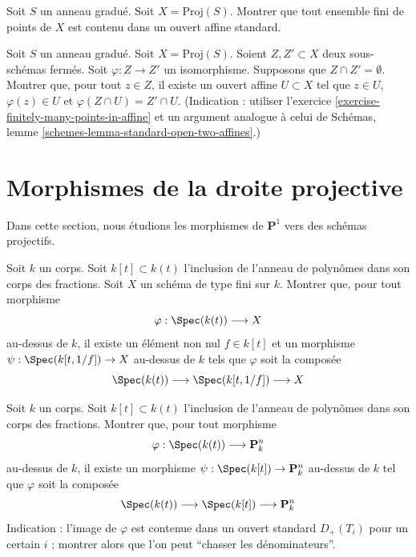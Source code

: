 \begin{exercise}
\label{exercise-finitely-many-points-in-affine}
Soit $S$ un anneau gradué.
Soit $X = \text{Proj}(S)$.
Montrer que tout ensemble fini de points de $X$ est contenu dans un ouvert
affine standard.
\end{exercise}

\begin{exercise}
\label{exercise-prepare-glueing}
Soit $S$ un anneau gradué.
Soit $X = \text{Proj}(S)$.
Soient $Z, Z' \subset X$ deux sous-schémas fermés.
Soit $\varphi : Z \to Z'$ un isomorphisme.
Supposons que $Z \cap Z' = \emptyset$.
Montrer que, pour tout $z \in Z$, il existe un ouvert affine
$U \subset X$ tel que $z \in U$, $\varphi(z) \in U$ et
$\varphi(Z \cap U) = Z' \cap U$.
(Indication : utiliser l'exercice \ref{exercise-finitely-many-points-in-affine}
et un argument analogue à celui de
Schémas, lemme \ref{schemes-lemma-standard-open-two-affines}.)
\end{exercise}







\section{Morphismes de la droite projective}
\label{section-from-P1}

\noindent
Dans cette section, nous étudions les morphismes de $\mathbf{P}^1$
vers des schémas projectifs.

\begin{exercise}
\label{exercise-from-generic-point}
Soit $k$ un corps. Soit $k[t] \subset k(t)$
l'inclusion de l'anneau de polynômes dans son corps des fractions.
Soit $X$ un schéma de type fini sur $k$.
Montrer que, pour tout morphisme
$$
\varphi : \Spec(k(t)) \longrightarrow X
$$
au-dessus de $k$, il existe un élément non nul $f \in k[t]$ et un morphisme
$\psi : \Spec(k[t, 1/f]) \to X$ au-dessus de $k$
tels que $\varphi$ soit la composée
$$
\Spec(k(t)) \longrightarrow \Spec(k[t, 1/f]) \longrightarrow X
$$
\end{exercise}

\begin{exercise}
\label{exercise-from-generic-point-Pn}
Soit $k$ un corps. Soit $k[t] \subset k(t)$
l'inclusion de l'anneau de polynômes dans son corps des fractions.
Montrer que, pour tout morphisme
$$
\varphi : \Spec(k(t)) \longrightarrow \mathbf{P}^n_k
$$
au-dessus de $k$, il existe un morphisme $\psi : \Spec(k[t]) \to \mathbf{P}^n_k$
au-dessus de $k$ tel que $\varphi$ soit la composée
$$
\Spec(k(t)) \longrightarrow \Spec(k[t]) \longrightarrow \mathbf{P}^n_k
$$
Indication : l'image de $\varphi$ est contenue dans un ouvert standard $D_+(T_i)$
pour un certain $i$ ; montrer alors que l'on peut ``chasser les dénominateurs''.
\end{exercise}

